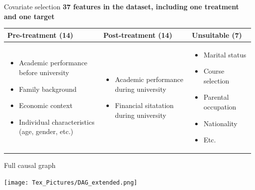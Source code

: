 \documentclass[aspectratio=169]{beamer}
\begin{document}
\begin{frame}{Covariate selection}
\textbf{37 features in the dataset, including one treatment and one target}
\begin{tabularx}{\textwidth}{X | X | X}
\textbf{Pre-treatment (14)}  & \textbf{Post-treatment (14)} & \textbf{Unsuitable (7)} \\[0.5ex]
\hline \hline 
\parbox[t]{4cm}{\vspace{-12pt} \begin{itemize}[label=--,leftmargin=1.2em,itemsep=1pt,topsep=2pt]
    \item Academic performance before university
    \item Family background
    \item Economic context
    \item Individual characteristics (age, gender, etc.)
\end{itemize}} 

&%
\parbox[t]{4cm}{\begin{itemize}[label=--,leftmargin=1.2em,itemsep=1pt,topsep=2pt]
    \item Academic performance during university
    \item Financial sitatation during university
\end{itemize}}
&
\parbox[t]{4cm}{\vspace{-12pt} \begin{itemize}[label=--,leftmargin=1.2em,itemsep=1pt,topsep=2pt]
    \item Marital status
    \item Course selection
    \item Parental occupation
    \item Nationality
    \item Etc.
\end{itemize}} 


\end{tabularx}


\end{frame}

\begin{frame}{Full causal graph}
	\begin{center}
     \texttt{[image: Tex\_Pictures/DAG\_extended.png]}
     \end{center}
\end{frame}
\end{document}
